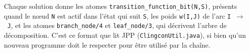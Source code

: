 Chaque solution donne les atomes \texttt{transition\_function\_bit(N,S)}, présents quand le nœud \texttt{N} est actif dans l'état qui suit \texttt{S}, les poids \texttt{w(I,J)} de l'arc \texttt{I}~$\to$~\texttt{J}, et les atomes \texttt{branch\_node/4} et \texttt{leaf\_node/3}, qui décrivent l'arbre de décomposition.
C'est ce format que lit JPP (\texttt{ClingconUtil.java}), si bien qu'un nouveau programme doit le respecter pour être utilisé par la chaîne.
